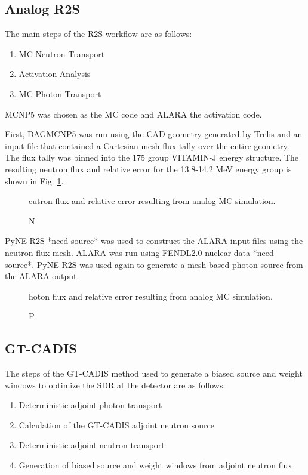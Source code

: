 \subsection{Analog R2S}\label{sec:analog}
The main steps of the R2S workflow are as follows:
\begin{enumerate}
	\item MC Neutron Transport
	\item Activation Analysis
	\item MC Photon Transport
\end{enumerate}
MCNP5 was chosen as the MC code and ALARA the activation code.  

First, DAGMCNP5 was run using the CAD geometry generated by Trelis and an input
file that contained a Cartesian mesh flux tally over the entire geometry.  The
flux tally was binned into the 175 group VITAMIN-J energy structure.  The resulting
neutron flux and relative error for the 13.8-14.2 MeV energy group is shown in
Fig. \ref{fig:nflux}.
\begin{figure} \label{fig:nflux}
  \caption Neutron flux and relative error resulting from analog MC simulation.
\end{figure}

PyNE R2S *need source* was used
to construct the ALARA input files using the neutron flux mesh.
ALARA was run using FENDL2.0 nuclear data *need source*. PyNE R2S
was used again to generate a mesh-based photon source from the ALARA output.  


\begin{figure} \label{fig:pflux}
  \caption Photon flux and relative error resulting from analog MC simulation.
\end{figure}

\subsection{GT-CADIS}\label{sec:gtcadis}
The steps of the GT-CADIS method used to generate a biased source and weight windows to optimize
the SDR at the detector are as follows:
\begin{enumerate}
	\item Deterministic adjoint photon transport
	\item Calculation of the GT-CADIS adjoint neutron source
	\item Deterministic adjoint neutron transport
	\item Generation of biased source and weight windows from adjoint neutron flux
\end{enumerate}

